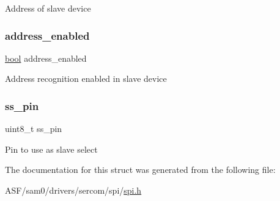 Address of slave device \mbox{\label{structspi__slave__inst_adae5ab61ddeae146a96386325f8e038b}} 
\subsubsection{\texorpdfstring{address\_enabled}{address\_enabled}}
{\footnotesize\ttfamily \mbox{\hyperlink{group__group__sam0__utils_ga97a80ca1602ebf2303258971a2c938e2}{bool}} address\+\_\+enabled}

Address recognition enabled in slave device \mbox{\label{structspi__slave__inst_ae5fb738f754cc7a762c6cc179079b1d8}} 
\subsubsection{\texorpdfstring{ss\_pin}{ss\_pin}}
{\footnotesize\ttfamily uint8\+\_\+t ss\+\_\+pin}

Pin to use as slave select 

The documentation for this struct was generated from the following file\+:\begin{DoxyCompactItemize}
\item 
A\+S\+F/sam0/drivers/sercom/spi/\mbox{\hyperlink{spi_8h}{spi.\+h}}\end{DoxyCompactItemize}
